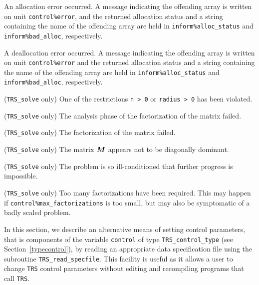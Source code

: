 \documentclass{galahad}
\newcommand{\packagename}{TRS}
\begin{document}
\begin{description}
 An allocation error occurred. A message indicating
the offending
array is written on unit {\tt control\%error}, and the returned allocation
status and a string containing the name of the offending array
are held in {\tt inform\%alloc\_\-status}
and {\tt inform\%bad\_alloc}, respectively.

 A deallocation error occurred.
A message indicating the offending
array is written on unit {\tt control\%error} and the returned allocation
status and a string containing the name of the offending array
are held in {\tt inform\%alloc\_\-status}
and {\tt inform\%bad\_alloc}, respectively.

 ({\tt \packagename\_solve} only)
One of the restrictions
{\tt n > 0}
or
{\tt radius > 0}
has been violated.

 ({\tt \packagename\_solve} only)
The analysis phase of the factorization of the matrix  failed.

 ({\tt \packagename\_solve} only)
The factorization of the matrix  failed.

 ({\tt \packagename\_solve} only)
The matrix ${\bm{M}}$ appears not to be diagonally dominant.

 ({\tt \packagename\_solve} only)
The problem is so ill-conditioned that further progress is impossible.

 ({\tt \packagename\_solve} only)
 Too many factorizations have been required.  This may happen if
    {\tt control\%max\_factorizations} is too small,
    but may also be symptomatic of a badly scaled problem.

\end{description}


\galfeatures
\noindent In this section, we describe an alternative means of setting
control parameters, that is components of the variable {\tt control} of type
{\tt \packagename\_control\_type}
(see Section~\ref{typecontrol}),
by reading an appropriate data specification file using the
subroutine {\tt \packagename\_read\_specfile}. This facility
is useful as it allows a user to change  {\tt \packagename} control parameters
without editing and recompiling programs that call {\tt \packagename}.
\end{document}
